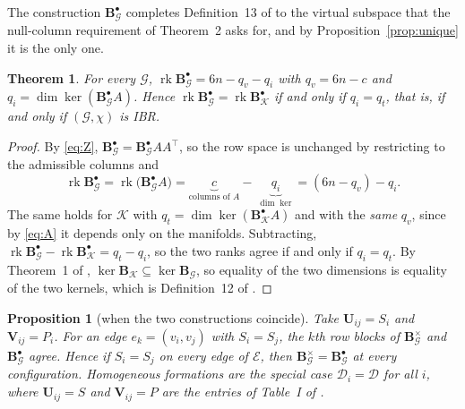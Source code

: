 \documentclass[11pt,a4paper]{article}
\theoremstyle{plain}
\newtheorem{theorem}{Theorem}
\newtheorem{proposition}{Proposition}
\theoremstyle{definition}
\newcommand{\rank}{\operatorname{rk}}
\newcommand{\Bper}{\mathbf{B}^{\times}}
\newcommand{\Bnode}{\mathbf{B}^{\bullet}}
\begin{document}
The construction $\Bnode_{\mathcal G}$ completes Definition~13 of
\cite{michieletto2021} to the virtual subspace that the null-column requirement
of Theorem~2 asks for, and by Proposition~\ref{prop:unique} it is the only one.

\begin{theorem}\label{thm:repair}
For every $\mathcal G$,
$\rank\Bnode_{\mathcal G}=6n-q_v-q_i$ with $q_v=6n-c$ and
$q_i=\dim\ker(\Bnode_{\mathcal G}A)$. Hence
$\rank\Bnode_{\mathcal G}=\rank\Bnode_{\mathcal K}$ if and only if $q_i=q_t$,
that is, if and only if $(\mathcal G,\chi)$ is IBR.
\end{theorem}

\begin{proof}
By \eqref{eq:Z}, $\Bnode_{\mathcal G}=\Bnode_{\mathcal G}AA^\top$, so the row
space is unchanged by restricting to the admissible columns and
\begin{equation*}
  \rank\Bnode_{\mathcal G}
  =\rank\bigl(\Bnode_{\mathcal G}A\bigr)
  =\underbrace{c}_{\text{columns of }A}-\ \underbrace{q_i}_{\dim\ker}
  =(6n-q_v)-q_i .
\end{equation*}
The same holds for $\mathcal K$ with $q_t=\dim\ker(\Bnode_{\mathcal K}A)$ and
with the \emph{same} $q_v$, since by \eqref{eq:A} it depends only on the
manifolds. Subtracting,
$\rank\Bnode_{\mathcal G}-\rank\Bnode_{\mathcal K}=q_t-q_i$, so the two ranks
agree if and only if $q_i=q_t$. By Theorem~1 of \cite{michieletto2021},
$\ker\mathbf B_{\mathcal K}\subseteq\ker\mathbf B_{\mathcal G}$, so equality of
the two dimensions is equality of the two kernels, which is Definition~12 of
\cite{michieletto2021}.
\end{proof}

\begin{proposition}[when the two constructions coincide]\label{prop:homog}
Take $\mathbf U_{ij}=S_i$ and $\mathbf V_{ij}=P_i$. For an edge
$e_k=(v_i,v_j)$ with $S_i=S_j$, the $k$th row blocks of $\Bper_{\mathcal G}$
and $\Bnode_{\mathcal G}$ agree. Hence if $S_i=S_j$ on every edge of
$\mathcal E$, then $\Bper_{\mathcal G}=\Bnode_{\mathcal G}$ at every
configuration. Homogeneous formations are the special case
$\mathcal D_i=\mathcal D$ for all $i$, where $\mathbf U_{ij}=S$ and
$\mathbf V_{ij}=P$ are the entries of Table~I of \cite{michieletto2021}.
\end{proposition}
\end{document}
